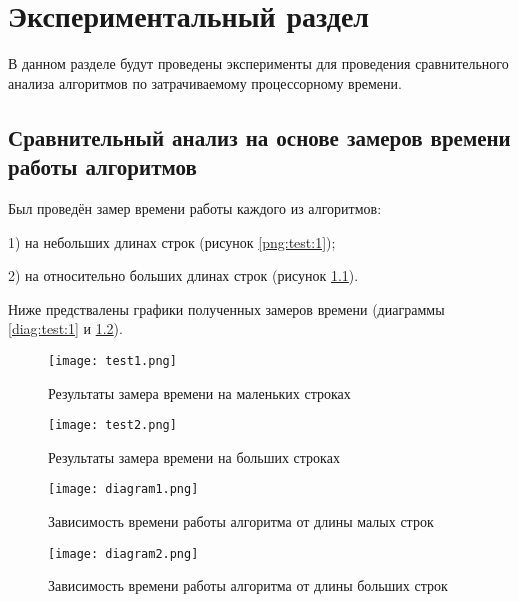 \chapter{Экспериментальный раздел}
\label{cha:research}
    В данном разделе будут проведены эксперименты для проведения 
    сравнительного анализа алгоритмов по затрачиваемому процессорному 
    времени\cite{CPU-time}.
    \section{Сравнительный анализ на основе замеров времени работы алгоритмов}
    
        Был проведён замер времени работы каждого из алгоритмов:
        
        1) на небольших длинах строк (рисунок \ref{png:test:1});
        
        2) на относительно больших длинах строк (рисунок \ref{png:test:2}).
        
        Ниже предствалены графики полученных замеров времени
        (диаграммы \ref{diag:test:1} и \ref{diag:test:2}).

        \begin{figure}[h!]
            \centering
            \texttt{[image: test1.png]}
            \caption{Результаты замера времени на маленьких строках}
            \label{png:test:1}

            \texttt{[image: test2.png]}
            \caption{Результаты замера времени на больших строках}
            \label{png:test:2}
        \end{figure}

        \begin{figure}[h!]
            \centering
            \texttt{[image: diagram1.png]}
            \caption{Зависимость времени работы алгоритма от длины малых строк}
            \label{diag:test:1}
            \texttt{[image: diagram2.png]}
            \caption{Зависимость времени работы алгоритма от длины больших строк}
            \label{diag:test:2}
        \end{figure}
\newpage